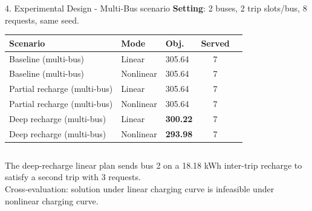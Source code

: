 \documentclass[10pt,aspectratio=169]{beamer}
\begin{document}
\begin{frame}{4. Experimental Design - Multi-Bus scenario}
\textbf{Setting}: 2 buses, 2 trip slots/bus, 8 requests, same seed.

\vspace{6pt}
\centering\small
\begin{tabular}{@{}lllcr@{}}
\toprule
\textbf{Scenario} & \textbf{Mode} & \textbf{Obj.} & \textbf{Served} \\
\midrule
Baseline (multi-bus)         & Linear     & 305.64 & 7 \\
Baseline (multi-bus)         & Nonlinear  & 305.64 & 7 \\
Partial recharge (multi-bus) & Linear     & 305.64 & 7 \\
Partial recharge (multi-bus) & Nonlinear  & 305.64 & 7 \\
Deep recharge (multi-bus)    & Linear     & \textbf{300.22} & 7 \\
Deep recharge (multi-bus)    & Nonlinear  & \textbf{293.98} & 7 \\
\bottomrule
\end{tabular}

\vspace{8pt}
\begin{columns}[T,onlytextwidth]
\column{\textwidth}
\begin{block}{}
\small
The deep-recharge linear plan sends bus 2 on a 18.18 kWh inter-trip recharge to satisfy a second trip with 3 requests. \\
Cross-evaluation: solution under linear charging curve is infeasible under nonlinear charging curve.
\end{block}
\end{columns}
\end{frame}

\end{document}
